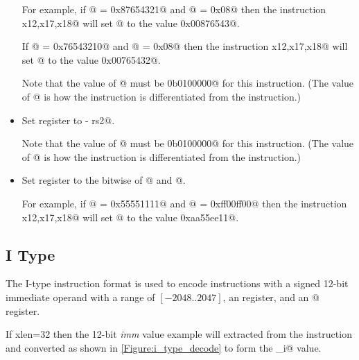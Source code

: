 \begin{itemize}
For example, if @ = \verb@0x87654321@ and @ = \verb@0x08@
then the instruction \verb@srl x12,x17,x18@ will set @ to the
value \verb@0x00876543@.

If @ = \verb@0x76543210@ and @ = \verb@0x08@
then the instruction \verb@srl x12,x17,x18@ will set @ to the
value \verb@0x00765432@.

Note that the value of @ must be \verb@0b0100000@ for this instruction.
(The value of @ is how the \verb@srl@ instruction is differentiated
from the \verb@sra@ instruction.)

\item{}
\label{insn:sub}

Set register \verb@rd@ to  - rs2@.

Note that the value of @ must be \verb@0b0100000@ for this instruction.
(The value of @ is how the \verb@sub@ instruction is differentiated
from the \verb@add@ instruction.)

\item{}
\label{insn:xor}

Set register \verb@rd@ to the bitwise \verb@xor@ of @ and  @.

For example, if @ = \verb@0x55551111@ and @ = \verb@0xff00ff00@
then the instruction \verb@xor x12,x17,x18@ will set @ to the
value \verb@0xaa55ee11@.

\end{itemize}

\subsection{I Type}
\label{insnformat:itype}

The I-type instruction format is used to encode instructions with a
signed 12-bit immediate operand with a range of $[-2048..2047]$,
an \verb@rd@ register, and an @ register.

If \Gls{xlen}=32 then the 12-bit {\em imm} value example will extracted from
the instruction and converted as shown in \autoref{Figure:i_type_decode}
to form the \verb@imm_i@ value.

